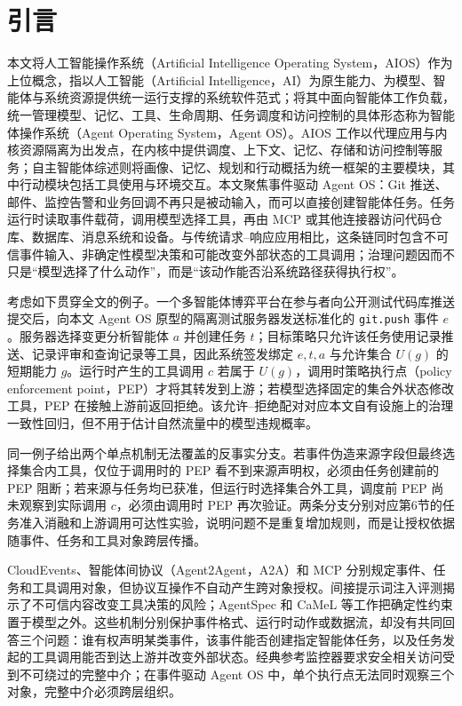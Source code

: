 \section*{引言}\label{sec:introduction-v11}

本文将人工智能操作系统（Artificial Intelligence Operating System，AIOS）作为上位概念，指以人工智能（Artificial Intelligence，AI）为原生能力、为模型、智能体与系统资源提供统一运行支撑的系统软件范式；将其中面向智能体工作负载，统一管理模型、记忆、工具、生命周期、任务调度和访问控制的具体形态称为智能体操作系统（Agent Operating System，Agent OS）。AIOS 工作以代理应用与内核资源隔离为出发点，在内核中提供调度、上下文、记忆、存储和访问控制等服务\cite{aios}；自主智能体综述则将画像、记忆、规划和行动概括为统一框架的主要模块，其中行动模块包括工具使用与环境交互\cite{agent-survey}。本文聚焦事件驱动 Agent OS：Git 推送、邮件、监控告警和业务回调不再只是被动输入，而可以直接创建智能体任务。任务运行时读取事件载荷，调用模型选择工具，再由 MCP 或其他连接器访问代码仓库、数据库、消息系统和设备。与传统请求--响应应用相比，这条链同时包含不可信事件输入、非确定性模型决策和可能改变外部状态的工具调用；治理问题因而不只是“模型选择了什么动作”，而是“该动作能否沿系统路径获得执行权”。

考虑如下贯穿全文的例子。一个多智能体博弈平台在参与者向公开测试代码库推送提交后，向本文 Agent OS 原型的隔离测试服务器发送标准化的 \texttt{git.push} 事件 $e$。服务器选择变更分析智能体 $a$ 并创建任务 $t$；目标策略只允许该任务使用记录推送、记录评审和查询记录等工具，因此系统签发绑定 $e,t,a$ 与允许集合 $U(g)$ 的短期能力 $g$。运行时产生的工具调用 $c$ 若属于 $U(g)$，调用时策略执行点（policy enforcement point，PEP）才将其转发到上游；若模型选择固定的集合外状态修改工具，PEP 在接触上游前返回拒绝。该允许--拒绝配对对应本文自有设施上的治理一致性回归，但不用于估计自然流量中的模型违规概率。

同一例子给出两个单点机制无法覆盖的反事实分支。若事件伪造来源字段但最终选择集合内工具，仅位于调用时的 PEP 看不到来源声明权，必须由任务创建前的 PEP 阻断；若来源与任务均已获准，但运行时选择集合外工具，调度前 PEP 尚未观察到实际调用 $c$，必须由调用时 PEP 再次验证。两条分支分别对应第6节的任务准入消融和上游调用可达性实验，说明问题不是重复增加规则，而是让授权依据随事件、任务和工具对象跨层传播。

CloudEvents、智能体间协议（Agent2Agent，A2A）和 MCP 分别规定事件、任务和工具调用对象\cite{cloudevents,a2a,mcp}，但协议互操作不自动产生跨对象授权。间接提示词注入评测揭示了不可信内容改变工具决策的风险\cite{indirect-pi,injecagent,agentdojo,toolemu}；AgentSpec 和 CaMeL 等工作把确定性约束置于模型之外\cite{agentspec,camel}。这些机制分别保护事件格式、运行时动作或数据流，却没有共同回答三个问题：谁有权声明某类事件，该事件能否创建指定智能体任务，以及任务发起的工具调用能否到达上游并改变外部状态。经典参考监控器要求安全相关访问受到不可绕过的完整中介\cite{reference-monitor,saltzer-schroeder}；在事件驱动 Agent OS 中，单个执行点无法同时观察三个对象，完整中介必须跨层组织。

